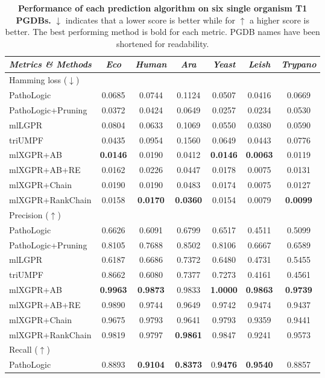 \documentclass[sn-mathphys,Numbered]{sn-jnl}%
\theoremstyle{thmstyleone}%
\theoremstyle{thmstyletwo}%
\theoremstyle{thmstylethree}%
\begin{document}
\begin{table}[ht]
\caption{\textbf{Performance of each prediction algorithm on six single organism T1 PGDBs.} $\downarrow$ indicates that a lower score is better while for $\uparrow$ a higher score is better. The best performing method is bold for each metric. PGDB names have been shortened for readability.}
\label{table:4}
\begin{tabular}{l c c c c c c}
 \hline
 \emph{Metrics \& Methods} &\emph{Eco}&\emph{Human}&\emph{Ara}&\emph{Yeast}&\emph{Leish}&\emph{Trypano}\\
 \hline
 \multicolumn{7}{l}{Hamming loss ($\downarrow$)}\\
 PathoLogic&0.0685&0.0744&0.1124&0.0507&0.0416&0.0669\\
 PathoLogic+Pruning&0.0372&0.0424&0.0649&0.0257&0.0234&0.0530\\
 mlLGPR&0.0804&0.0633&0.1069&0.0550&0.0380&0.0590\\
 triUMPF&0.0435&0.0954&0.1560&0.0649&0.0443&0.0776\\
mlXGPR+AB&\textbf{0.0146}&0.0190&0.0412&\textbf{0.0146}&\textbf{0.0063}&0.0119\\
mlXGPR+AB+RE&0.0162&0.0226&0.0447&0.0178&0.0075&0.0131\\
mlXGPR+Chain&0.0190&0.0190&0.0483&0.0174&0.0075&0.0127\\
mlXGPR+RankChain&0.0158&\textbf{0.0170}&\textbf{0.0360}&0.0154&0.0079&\textbf{0.0099}\\
 \hline
 \multicolumn{7}{l}{Precision ($\uparrow$)}\\
 PathoLogic&0.6626&0.6091&0.6799&0.6517&0.4511&0.5099\\
 PathoLogic+Pruning&0.8105&0.7688&0.8502&0.8106&0.6667&0.6589\\
 mlLGPR&0.6187&0.6686&0.7372&0.6480&0.4731&0.5455\\
 triUMPF&0.8662&0.6080&0.7377&0.7273&0.4161&0.4561\\
mlXGPR+AB&\textbf{0.9963}&\textbf{0.9873}&0.9833&\textbf{1.0000}&\textbf{0.9863}&\textbf{0.9739}\\
mlXGPR+AB+RE&0.9890&0.9744&0.9649&0.9742&0.9474&0.9437\\
mlXGPR+Chain&0.9675&0.9793&0.9641&0.9793&0.9359&0.9441\\
mlXGPR+RankChain&0.9819&0.9797&\textbf{0.9861}&0.9847&0.9241&0.9573\\
 \hline
 \multicolumn{7}{l}{Recall ($\uparrow$)}\\
 PathoLogic&0.8893&\textbf{0.9104}&\textbf{0.8373}&0.\textbf{9476}&\textbf{0.9540}&0.8857\\

\end{tabular}
\end{table}
\end{document}
